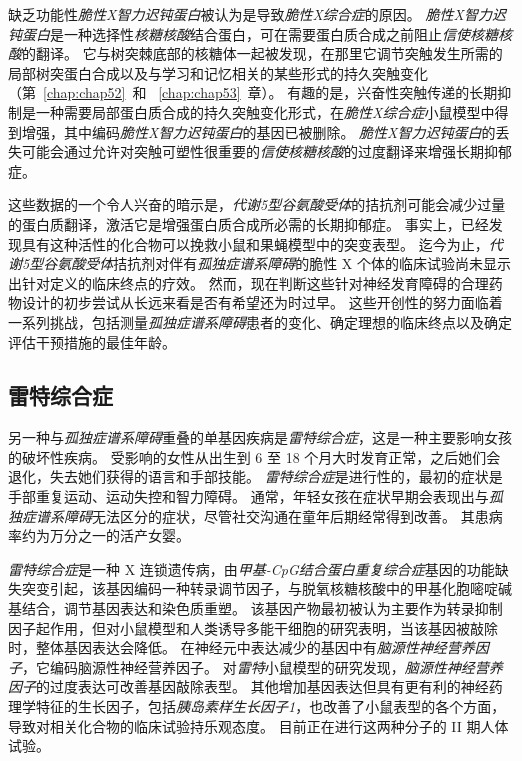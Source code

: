 缺乏功能性\textit{脆性X智力迟钝蛋白}被认为是导致\textit{脆性X综合症}的原因。
\textit{脆性X智力迟钝蛋白}是一种选择性\textit{核糖核酸}结合蛋白，可在需要蛋白质合成之前阻止\textit{信使核糖核酸}的翻译。
它与树突棘底部的核糖体一起被发现，在那里它调节突触发生所需的局部树突蛋白合成以及与学习和记忆相关的某些形式的持久突触变化（第~\ref{chap:chap52}~和 ~\ref{chap:chap53}~章）。
有趣的是，兴奋性突触传递的长期抑制是一种需要局部蛋白质合成的持久突触变化形式，在\textit{脆性X综合症}小鼠模型中得到增强，其中编码\textit{脆性X智力迟钝蛋白}的基因已被删除。
\textit{脆性X智力迟钝蛋白}的丢失可能会通过允许对突触可塑性很重要的\textit{信使核糖核酸}的过度翻译来增强长期抑郁症。


这些数据的一个令人兴奋的暗示是，\textit{代谢5型谷氨酸受体}的拮抗剂可能会减少过量的蛋白质翻译，激活它是增强蛋白质合成所必需的长期抑郁症。
事实上，已经发现具有这种活性的化合物可以挽救小鼠和果蝇模型中的突变表型。
迄今为止，\textit{代谢5型谷氨酸受体}拮抗剂对伴有\textit{孤独症谱系障碍}的脆性 X 个体的临床试验尚未显示出针对定义的临床终点的疗效。
然而，现在判断这些针对神经发育障碍的合理药物设计的初步尝试从长远来看是否有希望还为时过早。
这些开创性的努力面临着一系列挑战，包括测量\textit{孤独症谱系障碍}患者的变化、确定理想的临床终点以及确定评估干预措施的最佳年龄。



\subsection{雷特综合症}

另一种与\textit{孤独症谱系障碍}重叠的单基因疾病是\textit{雷特综合症}，这是一种主要影响女孩的破坏性疾病。
受影响的女性从出生到 6 至 18 个月大时发育正常，之后她们会退化，失去她们获得的语言和手部技能。
\textit{雷特综合症}是进行性的，最初的症状是手部重复运动、运动失控和智力障碍。
通常，年轻女孩在症状早期会表现出与\textit{孤独症谱系障碍}无法区分的症状，尽管社交沟通在童年后期经常得到改善。
其患病率约为万分之一的活产女婴。


\textit{雷特综合症}是一种 X 连锁遗传病，由\textit{甲基-CpG结合蛋白重复综合症}基因的功能缺失突变引起，该基因编码一种转录调节因子，与脱氧核糖核酸中的甲基化胞嘧啶碱基结合，调节基因表达和染色质重塑。
该基因产物最初被认为主要作为转录抑制因子起作用，但对小鼠模型和人类诱导多能干细胞的研究表明，当该基因被敲除时，整体基因表达会降低。
在神经元中表达减少的基因中有\textit{脑源性神经营养因子}，它编码脑源性神经营养因子。
对\textit{雷特}小鼠模型的研究发现，\textit{脑源性神经营养因子}的过度表达可改善基因敲除表型。
其他增加基因表达但具有更有利的神经药理学特征的生长因子，包括\textit{胰岛素样生长因子1}，也改善了小鼠表型的各个方面，导致对相关化合物的临床试验持乐观态度。
目前正在进行这两种分子的 II 期人体试验。


